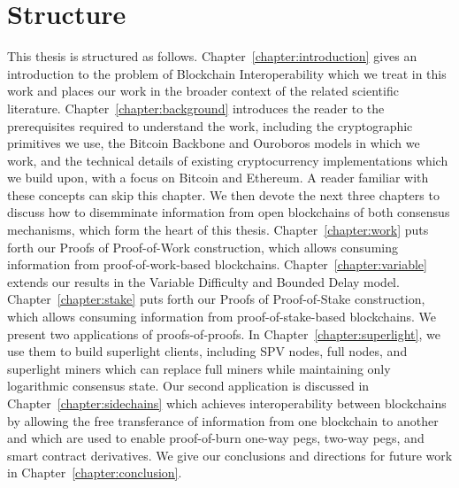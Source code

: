 \section*{Structure}

This thesis is structured as follows. Chapter~\ref{chapter:introduction} gives
an introduction to the problem of Blockchain Interoperability which we treat in
this work and places our work in the broader context of the related scientific
literature. Chapter~\ref{chapter:background} introduces the reader to the
prerequisites required to understand the work, including the cryptographic
primitives we use, the Bitcoin Backbone and Ouroboros models in which we work, and the
technical details of existing cryptocurrency implementations which we build
upon, with a focus on Bitcoin and Ethereum. A reader familiar with
these concepts can skip this chapter. We then devote the next three chapters to
discuss how to disemminate information from open blockchains of both consensus
mechanisms, which form the heart of this thesis. Chapter~\ref{chapter:work} puts forth our Proofs of Proof-of-Work
construction, which allows consuming information from proof-of-work-based
blockchains. Chapter~\ref{chapter:variable} extends our results in the Variable Difficulty and Bounded Delay model. Chapter~\ref{chapter:stake} puts forth our Proofs of
Proof-of-Stake construction, which allows consuming information from
proof-of-stake-based blockchains. We present two applications of
proofs-of-proofs. In Chapter~\ref{chapter:superlight}, we use them to build
superlight clients, including SPV nodes, full nodes, and superlight miners which
can replace full miners while maintaining only logarithmic consensus state. Our
second application is discussed in Chapter~\ref{chapter:sidechains} which
achieves interoperability between blockchains by allowing the free transferance
of information from one blockchain to another and which are used to enable proof-of-burn one-way pegs, two-way pegs, and smart contract derivatives. We give our conclusions and
directions for future work in Chapter~\ref{chapter:conclusion}.

